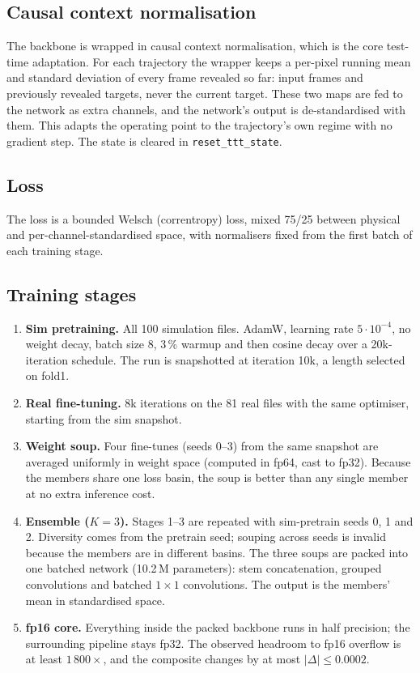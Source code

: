 \documentclass[10pt]{article}
\newcommand{\cfg}[1]{\texttt{#1}}
\begin{document}
\subsection{Causal context normalisation}
The backbone is wrapped in causal context normalisation, which is the core test-time adaptation. For each
trajectory the wrapper keeps a per-pixel running mean and standard deviation of every frame revealed so far:
input frames and previously revealed targets, never the current target. These two maps are fed to the network
as extra channels, and the network's output is de-standardised with them. This adapts the operating point to
the trajectory's own regime with no gradient step. The state is cleared in \cfg{reset\_ttt\_state}.

\subsection{Loss}
The loss is a bounded Welsch (correntropy) loss, mixed 75/25 between physical and per-channel-standardised
space, with normalisers fixed from the first batch of each training stage.

\subsection{Training stages}
\begin{enumerate}
\item \textbf{Sim pretraining.} All 100 simulation files. AdamW, learning rate $5\cdot10^{-4}$, no weight decay,
  batch size 8, 3\,\% warmup and then cosine decay over a 20k-iteration schedule. The run is snapshotted at
  iteration 10k, a length selected on fold1.
\item \textbf{Real fine-tuning.} 8k iterations on the 81 real files with the same optimiser, starting from the
  sim snapshot.
\item \textbf{Weight soup.} Four fine-tunes (seeds 0--3) from the same snapshot are averaged uniformly in weight
  space (computed in fp64, cast to fp32). Because the members share one loss basin, the soup is better than any
  single member at no extra inference cost.
\item \textbf{Ensemble ($K=3$).} Stages 1--3 are repeated with sim-pretrain seeds 0, 1 and 2. Diversity comes
  from the pretrain seed; souping across seeds is invalid because the members are in different basins. The three
  soups are packed into one batched network (10.2\,M parameters): stem concatenation, grouped convolutions and
  batched $1{\times}1$ convolutions. The output is the members' mean in standardised space.
\item \textbf{fp16 core.} Everything inside the packed backbone runs in half precision; the surrounding
  pipeline stays fp32. The observed headroom to fp16 overflow is at least $1\,800\times$, and the composite
  changes by at most $|\Delta|\le0.0002$.
\end{enumerate}
\end{document}
